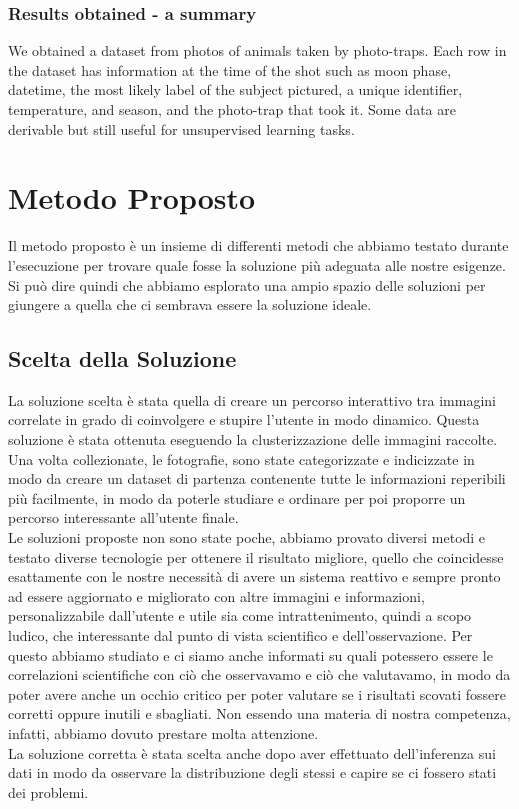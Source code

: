 \documentclass[12pt,a4paper,twoside]{article}
\begin{document}
\subsubsection{Results obtained - a summary}
We obtained a dataset from photos of animals taken by photo-traps. Each row in the dataset has information at the time of the shot such as moon phase, datetime, the most likely label of the subject pictured, a unique identifier, temperature, and season, and the photo-trap that took it. Some data are derivable but still useful for unsupervised learning tasks.

\newpage
\section{Metodo Proposto}
Il metodo proposto è un insieme di differenti metodi che abbiamo testato durante l'esecuzione
per trovare quale fosse la soluzione più adeguata alle nostre esigenze.\\
Si può dire quindi che abbiamo esplorato una ampio spazio delle soluzioni per giungere a quella 
che ci sembrava essere la soluzione ideale.

\subsection{Scelta della Soluzione}
La soluzione scelta è stata quella di creare un percorso interattivo tra immagini correlate in 
grado di coinvolgere e stupire l'utente in modo dinamico. Questa soluzione è stata ottenuta 
eseguendo la clusterizzazione delle immagini raccolte.\\
Una volta collezionate, le fotografie, sono state categorizzate e indicizzate in modo da creare 
un dataset di partenza contenente tutte le informazioni reperibili più facilmente, in modo da 
poterle studiare e ordinare per poi proporre un percorso interessante all'utente finale.\\
Le soluzioni proposte non sono state poche, abbiamo provato diversi metodi e testato diverse 
tecnologie per ottenere il risultato migliore, quello che coincidesse esattamente con le nostre 
necessità di avere un sistema reattivo e sempre pronto ad essere aggiornato e migliorato con 
altre immagini e informazioni, personalizzabile dall'utente e utile sia come intrattenimento, 
quindi a scopo ludico, che interessante dal punto di vista scientifico e dell'osservazione. Per 
questo abbiamo studiato e ci siamo anche informati su quali potessero essere le correlazioni 
scientifiche con ciò che osservavamo e ciò che valutavamo, in modo da poter avere anche un 
occhio critico per poter valutare se i risultati scovati fossere corretti oppure inutili e 
sbagliati. Non essendo una materia di nostra competenza, infatti, abbiamo dovuto prestare molta 
attenzione.\\
La soluzione corretta è stata scelta anche dopo aver effettuato dell'inferenza sui dati in modo 
da osservare la distribuzione degli stessi e capire se ci fossero stati dei problemi. 
\end{document}
